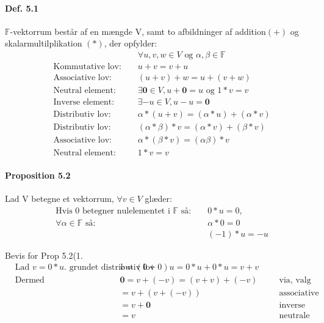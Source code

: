 \documentclass[paper=a4, fontsize=11pt]{scrartcl} %
\begin{document}
	\paragraph{Def. 5.1} $\mathbb{F}$-vektorrum består af en mængde V, samt to afbildninger af addition$(+)$ og skalarmultilplikation $(*)$, der opfylder:
	\begin{align}
	\nonumber & &&\forall u,v,w\in V \text{ og } \alpha,\beta\in \mathbb{F} \\
	&\text{Kommutative lov: }&& u+v=v+u \\
	&\text{Associative lov: }&& (u+v)+w=u+(v+w) \\
	&\text{Neutral element: }&& \exists\mathbf{0}\in V, u+\mathbf{0}=u \text{ og } 1*v = v\\
	&\text{Inverse element: }&& \exists-u\in V, u-u=\mathbf{0}\\
	&\text{Distributiv lov: }&& \alpha*(u+v)=(\alpha*u)+(\alpha*v) \\
	&\text{Distributiv lov: }&& (\alpha*\beta)*v=(\alpha*v)+(\beta*v)\\
	&\text{Associative lov:}&& \alpha*(\beta*v)=(\alpha\beta)*v \\
	&\text{Neutral element: }&& 1*v=v
	\end{align}
	
	\paragraph{Proposition 5.2} Lad V betegne et vektorrum, $\forall v \in V$ glæder:
	\setcounter{equation}{0}
	\begin{align}
	&\text{Hvis 0 betegner nulelementet i }\mathbb{F} \text{ så: }&& 0*u=0,  \\
	&\forall\alpha\in \mathbb{F} \text{ så: }&& \alpha*0=0 \\
	& && (-1)*u=-u
	\end{align}
	
	Bevis for Prop 5.2(1.
	\begin{align*}
	&\text{Lad $v = 0*u$. grundet distributiv lov så: }&& v=(0+0)u=0*u+0*u=v+v &&&\\
	&\text{Dermed}&& \mathbf{0}=v+(-v)=(v+v)+(-v) &&&\text{via, valg af v} \\
	& && =v+(v+(-v)) &&& \text{associative lov}\\
	& &&  =v+\mathbf{0} &&& \text{inverse element} \\
	& && =v &&& \text{neutrale element}
	\end{align*}
	
\end{document}
